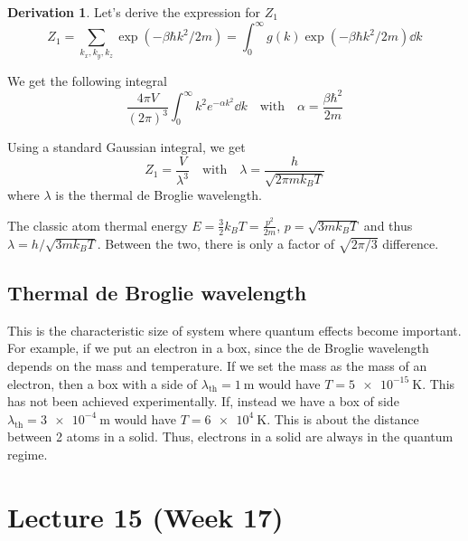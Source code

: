 \documentclass[12pt,chapterprefix=false,dvipsnames]{scrbook}
\theoremstyle{dotless}
\theoremstyle{definition}
\newtheorem{protoderivation}{Derivation}[section]
\newenvironment{derivation}
{\colorlet{shadecolor}{purple!15}\begin{shaded}\begin{protoderivation}}
			{\end{protoderivation}\end{shaded}}
\begin{document}
\begin{derivation}
	Let's derive the expression for $Z_1$
	\begin{equation}
		Z_1 = \sum_{k_x,k_y,k_z} \exp\left(-\beta \hbar k^2 / 2m\right) =
		\int_0^\infty g\left(k\right)
		\exp\left(-\beta \hbar k^2 / 2m\right) \dd{k}
	\end{equation}

	We get the following integral
	\begin{equation}
		\frac{4\pi V}{{\left(2\pi\right)}^3} \int_0^\infty k^2
		e^{-\alpha k^2} \dd{k}
		\hspace{1em} \mathrm{with}
		\hspace{1em} \alpha = \frac{\beta \hbar^2}{2m}
	\end{equation}

	Using a standard Gaussian integral, we get
	\begin{equation}
		\label{eq:partition_function}
		Z_1 = \frac{V}{\lambda^3} \hspace{1em}
		\mathrm{with} \hspace{1em} \lambda =
		\frac{h}{\sqrt{2\pi m k_B T}}
	\end{equation}
	where $\lambda$ is the thermal de Broglie
	wavelength.

	The classic atom thermal energy $E = \frac{3}{2}k_B	T = \frac{p^2}{2m}$,
	$ p = \sqrt{3 m k_B T} $ and thus $ \lambda = h / \sqrt{3m k_B T} $.
	Between the two, there is only a factor of
	$\sqrt{2\pi/3}$ difference.
\end{derivation}

\section{Thermal de Broglie wavelength}%
\label{sec:thermal_de_broglie_wavelength}

This is the characteristic size of system where quantum effects
become important. For example, if we put an electron in a box,
since the de Broglie wavelength depends on the mass and
temperature. If we set the mass as the mass of an electron, then
a box with a side of $\lambda_{\mathrm{th}} =
	\SI{1}{\metre}$ would have
$T = \SI{ 5e-15 }{\kelvin}$. This has not been achieved
experimentally. If, instead we have a box of side
$\lambda_{\mathrm{th}} =
	\SI{3e-4}{\metre}$ would have $T = \SI{ 6e4 }{\kelvin}$. This
is about the distance between 2 atoms in a solid. Thus,
electrons in a solid are always in the quantum regime.

\chapter{Lecture 15 (Week 17)}%
\label{cha:lecture_15}
\end{document}
